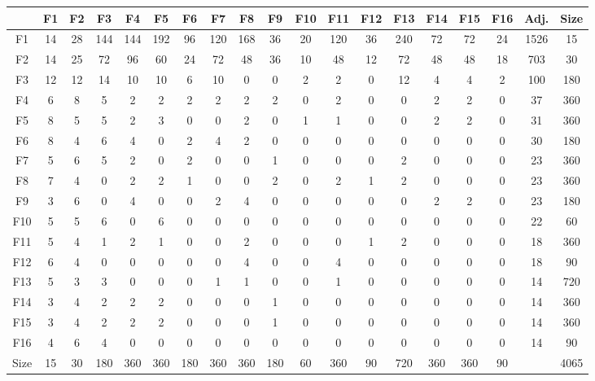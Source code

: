 \documentclass[12pt]{article}
\begin{document}
\begin{center}
\scriptsize
\begin{tabular}{|c|cccccccccccccccc|c|c|}
\hline
&F1&F2&F3&F4&F5&F6&F7&F8&F9&F10&F11&F12&F13&F14&F15&F16&Adj.&Size\\
\hline
F1& 14& 28& 144& 144& 192& 96& 120& 168& 36& 20& 120& 36& 240& 72& 72& 24&1526&15\\
F2& 14& 25& 72& 96& 60& 24& 72& 48& 36& 10& 48& 12& 72& 48& 48& 18&703&30\\
F3& 12& 12& 14& 10& 10& 6& 10& 0& 0& 2& 2& 0& 12& 4& 4& 2&100&180\\
F4& 6& 8& 5& 2& 2& 2& 2& 2& 2& 0& 2& 0& 0& 2& 2& 0&37&360\\
F5& 8& 5& 5& 2& 3& 0& 0& 2& 0& 1& 1& 0& 0& 2& 2& 0&31&360\\
F6& 8& 4& 6& 4& 0& 2& 4& 2& 0& 0& 0& 0& 0& 0& 0& 0&30&180\\
F7& 5& 6& 5& 2& 0& 2& 0& 0& 1& 0& 0& 0& 2& 0& 0& 0&23&360\\
F8& 7& 4& 0& 2& 2& 1& 0& 0& 2& 0& 2& 1& 2& 0& 0& 0&23&360\\
F9& 3& 6& 0& 4& 0& 0& 2& 4& 0& 0& 0& 0& 0& 2& 2& 0&23&180\\
F10& 5& 5& 6& 0& 6& 0& 0& 0& 0& 0& 0& 0& 0& 0& 0& 0&22&60\\
F11& 5& 4& 1& 2& 1& 0& 0& 2& 0& 0& 0& 1& 2& 0& 0& 0&18&360\\
F12& 6& 4& 0& 0& 0& 0& 0& 4& 0& 0& 4& 0& 0& 0& 0& 0&18&90\\
F13& 5& 3& 3& 0& 0& 0& 1& 1& 0& 0& 1& 0& 0& 0& 0& 0&14&720\\
F14& 3& 4& 2& 2& 2& 0& 0& 0& 1& 0& 0& 0& 0& 0& 0& 0&14&360\\
F15& 3& 4& 2& 2& 2& 0& 0& 0& 1& 0& 0& 0& 0& 0& 0& 0&14&360\\
F16& 4& 6& 4& 0& 0& 0& 0& 0& 0& 0& 0& 0& 0& 0& 0& 0&14&90\\
\hline
Size&15&30&180&360&360&180&360&360&180&60&360&90&720&360&360&90&&4065\\
\hline
\end{tabular}
\end{center}
\end{document}
